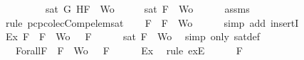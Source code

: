 \begin{isabellebody}
\ \ \ \ \ \ \ \ \ {\isachardoublequoteopen}sat\ {\isacharparenleft}{\isacharbraceleft}G{\isacharcomma}\isactrlbold {\isasymnot}\ H{\isacharcomma}F{\isacharbraceright}\ {\isasymunion}\ Wo{\isacharparenright}{\isachardoublequoteclose}\isanewline
%
\isadelimproof
%
\endisadelimproof
%
\isatagproof
{}\isamarkupfalse%
\ {\isacharminus}\isanewline
\ \ \isamarkupfalse%
\ {\isachardoublequoteopen}sat\ {\isacharparenleft}{\isacharbraceleft}F{\isacharbraceright}\ {\isasymunion}\ Wo{\isacharparenright}{\isachardoublequoteclose}\isanewline
\ \ \ \ \isamarkupfalse%
\ assms{\isacharparenleft}{}{\isacharcomma}{}{\isacharcomma}{}{\isacharcomma}{}{\isacharparenright}\ \isamarkupfalse%
\ {\isacharparenleft}rule\ pcp{\isacharunderscore}colecComp{\isacharunderscore}elem{\isacharunderscore}sat{\isacharparenright}\isanewline
\ \ \isamarkupfalse%
\ {\isachardoublequoteopen}F\ {\isasymin}\ {\isacharbraceleft}F{\isacharbraceright}\ {\isasymunion}\ Wo{\isachardoublequoteclose}\isanewline
\ \ \ \ \isamarkupfalse%
\ {\isacharparenleft}simp\ add{\isacharcolon}\ insertI{}{\isacharparenright}\isanewline
\ \ \isamarkupfalse%
\ Ex{}{\isacharcolon}{\isachardoublequoteopen}{\isasymexists}{\isasymA}{\isachardot}\ {\isasymforall}F\ {\isasymin}\ {\isacharparenleft}{\isacharbraceleft}F{\isacharbraceright}\ {\isasymunion}\ Wo{\isacharparenright}{\isachardot}\ {\isasymA}\ {\isasymTurnstile}\ F{\isachardoublequoteclose}\isanewline
\ \ \ \ \isamarkupfalse%
\ {\isacartoucheopen}sat\ {\isacharparenleft}{\isacharbraceleft}F{\isacharbraceright}\ {\isasymunion}\ Wo{\isacharparenright}{\isacartoucheclose}\ \isamarkupfalse%
\ {\isacharparenleft}simp\ only{\isacharcolon}\ sat{\isacharunderscore}def{\isacharparenright}\isanewline
\ \ \isamarkupfalse%
\ {\isasymA}\ \ Forall{}{\isacharcolon}{\isachardoublequoteopen}{\isasymforall}F\ {\isasymin}\ {\isacharparenleft}{\isacharbraceleft}F{\isacharbraceright}\ {\isasymunion}\ Wo{\isacharparenright}{\isachardot}\ {\isasymA}\ {\isasymTurnstile}\ F{\isachardoublequoteclose}\isanewline
\ \ \ \ \isamarkupfalse%
\ Ex{}\ \isamarkupfalse%
\ {\isacharparenleft}rule\ exE{\isacharparenright}\isanewline
\ \ \isamarkupfalse%
\ {\isachardoublequoteopen}{\isasymA}\ {\isasymTurnstile}\ F{\isachardoublequoteclose}\isanewline
\ \ \ \ \isamarkupfalse%

\end{isabellebody}
